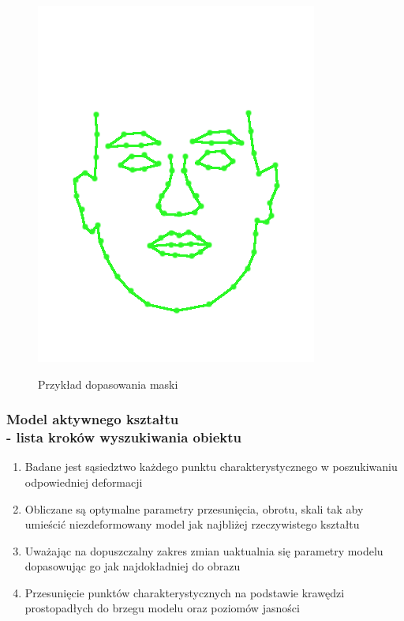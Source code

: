 \documentclass[xcolor=table]{beamer}
\begin{document}
\begin{frame}
\begin{center}
\begin{figure}
     {\includegraphics[scale=0.4]{aktywny1.png}}
    \caption{Przykład dopasowania maski}
  \end{figure}
\end{center}
\end{frame}

\begin{frame}
  \frametitle{Model aktywnego kształtu \\ - lista kroków wyszukiwania obiektu}
  \begin{enumerate}
\item Badane jest sąsiedztwo każdego punktu charakterystycznego w poszukiwaniu odpowiedniej deformacji
\item Obliczane są optymalne parametry przesunięcia, obrotu, skali tak aby umieścić niezdeformowany model jak najbliżej rzeczywistego kształtu
\item Uważając na dopuszczalny zakres zmian uaktualnia się parametry modelu dopasowując go jak najdokładniej do obrazu
\item Przesunięcie punktów charakterystycznych na podstawie krawędzi prostopadłych do brzegu modelu oraz poziomów jasności
\end{enumerate}
\end{frame}
\end{document}
